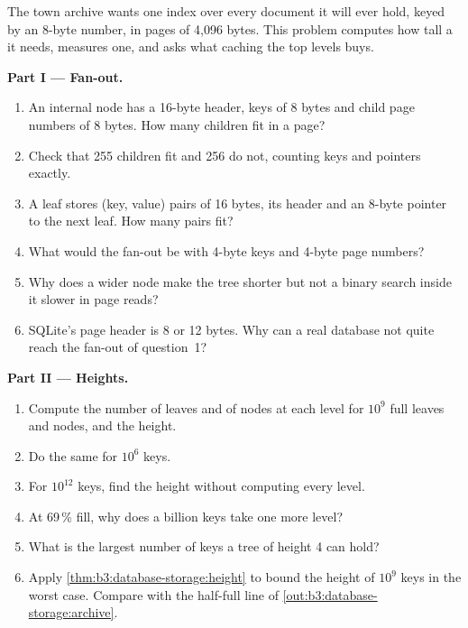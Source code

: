 \begin{problem}\label{pb:b3:database-storage:1}
The town archive wants one index over every document it will ever hold, keyed by an 8-byte number, in pages of 4,096 bytes. This problem computes how tall a  it needs, measures one, and asks what caching the top levels buys.

\label{lst:b3:database-storage:archive}

\label{out:b3:database-storage:archive}

\medskip\noindent\textbf{Part I --- Fan-out.}
\begin{enumerate}
  \item An internal node has a 16-byte header, keys of 8 bytes and child page numbers of 8 bytes. How many children fit in a page?
  \item Check that 255 children fit and 256 do not, counting keys and pointers exactly.
  \item A leaf stores (key, value) pairs of 16 bytes, its header and an 8-byte pointer to the next leaf. How many pairs fit?
  \item What would the fan-out be with 4-byte keys and 4-byte page numbers?
  \item Why does a wider node make the tree shorter but not a binary search inside it slower in page reads?
  \item SQLite's page header is 8 or 12 bytes. Why can a real database not quite reach the fan-out of question~1?
\end{enumerate}

\medskip\noindent\textbf{Part II --- Heights.}
\begin{enumerate}[resume]
  \item Compute the number of leaves and of nodes at each level for $10^9$ full leaves and nodes, and the height.
  \item Do the same for $10^6$ keys.
  \item For $10^{12}$ keys, find the height without computing every level.
  \item At 69\,\% fill, why does a billion keys take one more level?
  \item What is the largest number of keys a tree of height 4 can hold?
  \item Apply \cref{thm:b3:database-storage:height} to bound the height of $10^9$ keys in the worst case. Compare with the half-full line of \cref{out:b3:database-storage:archive}.
\end{enumerate}


\end{problem}
